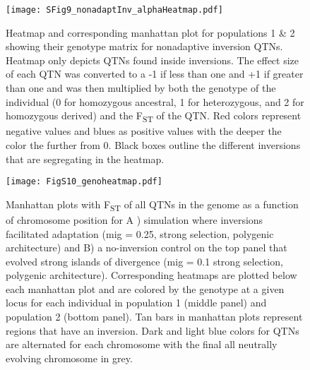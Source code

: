 \documentclass[10pt, scrartlc]{article}
\begin{document}
\begin{figure}[h]
	\begin{center}
		\texttt{[image: SFig9\_nonadaptInv\_alphaHeatmap.pdf]}
	\end{center}
	\caption[Supplementary Figure 9: Heatmap for nonadaptive inversion QTN effect sizes]{Heatmap and corresponding manhattan plot for populations 1 \& 2 showing their genotype matrix for nonadaptive inversion QTNs. Heatmap only depicts QTNs found inside inversions. The effect size of each QTN was converted to a -1 if less than one and +1 if greater than one and was then multiplied by both the genotype of the individual (0 for homozygous ancestral, 1 for heterozygous, and 2 for homozygous derived) and the F\textsubscript{ST} of the QTN. Red colors represent negative values and blues as positive values with the deeper the color the further from 0. Black boxes outline the different inversions that are segregating in the heatmap.}
\end{figure}

\clearpage
\newpage

\begin{figure}[h]
	\begin{center}
		\texttt{[image: FigS10\_genoheatmap.pdf]}
	\end{center}
	\caption[Supplementary Figure 10: Heatmaps of the genetic architecture of divergence]{Manhattan plots with F\textsubscript{ST} of all QTNs in the genome as a function of chromosome position for A ) simulation where inversions facilitated adaptation (mig = 0.25, strong selection, polygenic architecture) and B) a no-inversion control on the top panel that evolved strong islands of divergence (mig = 0.1 strong selection, polygenic architecture). Corresponding heatmaps are plotted below each manhattan plot and are colored by the genotype at a given locus for each individual in population 1 (middle panel) and population 2 (bottom panel). Tan bars in manhattan plots represent regions that have an inversion. Dark and light blue colors for QTNs are alternated for each chromosome with the final all neutrally evolving chromosome in grey. }
\end{figure}

\clearpage
\newpage
\end{document}
